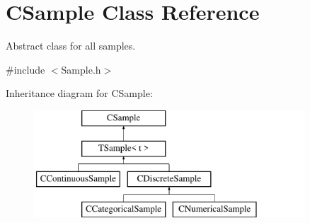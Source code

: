 \hypertarget{class_c_sample}{\section{C\-Sample Class Reference}
\label{class_c_sample}
}


Abstract class for all samples.  




{\ttfamily \#include $<$Sample.\-h$>$}

Inheritance diagram for C\-Sample\-:\begin{figure}[H]
\begin{center}
\leavevmode
\includegraphics[height=4.000000cm]{class_c_sample}
\end{center}
\end{figure}
